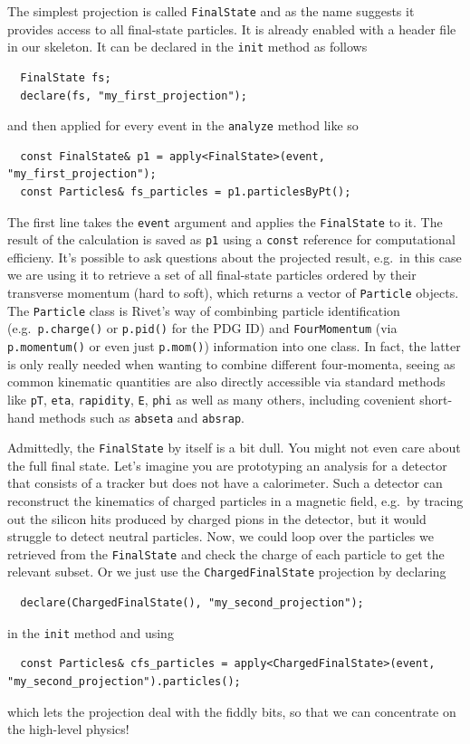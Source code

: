 \documentclass[10pt,fleqn]{scrartcl}
\theoremstyle{exstyle}
\begin{document}
The simplest projection is called 
\verb|FinalState| and as the name suggests
it provides access to all final-state particles. 
It is already enabled with a header file in our skeleton.
It can be declared in the \verb|init| method as follows
\begin{verbatim}
  FinalState fs;
  declare(fs, "my_first_projection");
\end{verbatim}
and then applied for every event in the \verb|analyze|
method like so
\begin{verbatim}
  const FinalState& p1 = apply<FinalState>(event, "my_first_projection");
  const Particles& fs_particles = p1.particlesByPt();
\end{verbatim}
The first line takes the \verb|event| argument and applies
the \verb|FinalState| to it. The result of the calculation
is saved as \verb|p1| using a \verb|const| reference
for computational efficieny. It's possible to ask questions
about the projected result, e.g.\ in this case
we are using it to retrieve a set of all final-state particles
ordered by their transverse momentum (hard to soft), which 
returns a vector of \verb|Particle| objects. The \verb|Particle|
class is Rivet's way of combinbing particle identification 
(e.g.\ \verb|p.charge()| or \verb|p.pid()| for the PDG ID)
and \verb|FourMomentum| (via \verb|p.momentum()| or even just \verb|p.mom()|) 
information into one class. 
In fact, the latter is only really needed when wanting to combine 
different four-momenta, seeing as common kinematic quantities
are also directly accessible via standard methods like
\verb|pT|, 
\verb|eta|, 
\verb|rapidity|, 
\verb|E|, 
\verb|phi| as well as many others, 
including covenient short-hand methods such as \verb|abseta| and \verb|absrap|.

Admittedly, the \verb|FinalState| by itself is a bit dull. 
You might not even care about the full final state. Let's imagine you
are prototyping an analysis for a detector that consists of a tracker
but does not have a calorimeter. Such a detector 
can reconstruct the kinematics of charged particles in
a magnetic field, e.g.\ by tracing out the silicon hits
produced by charged pions in the detector, but it would
struggle to detect neutral particles. 
Now, we could loop over the particles we retrieved
from the \verb|FinalState| and 
check the charge of each particle to get the relevant subset.
Or we just use the \verb|ChargedFinalState| projection by declaring
\begin{verbatim}
  declare(ChargedFinalState(), "my_second_projection");
\end{verbatim}
in the \verb|init| method and using
\begin{footnotesize}
\begin{verbatim}
  const Particles& cfs_particles = apply<ChargedFinalState>(event, "my_second_projection").particles();
\end{verbatim}
\end{footnotesize}
which lets the projection deal with the fiddly bits,
so that we can concentrate on the high-level physics!
\end{document}
